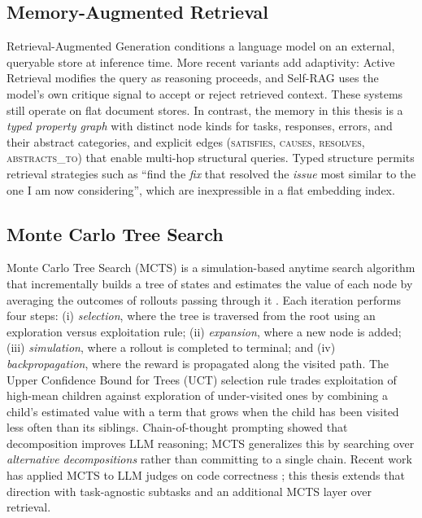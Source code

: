 \documentclass[12pt,a4paper]{report}
\begin{document}
\subsection{Memory-Augmented Retrieval}

Retrieval-Augmented Generation \cite{rag_original2020} conditions a language model on an external, queryable store at inference time. More recent variants add adaptivity: Active Retrieval \cite{active_rag2023} modifies the query as reasoning proceeds, and Self-RAG \cite{self_rag2023} uses the model's own critique signal to accept or reject retrieved context. These systems still operate on flat document stores. In contrast, the memory in this thesis is a \textit{typed property graph} with distinct node kinds for tasks, responses, errors, and their abstract categories, and explicit edges (\textsc{satisfies}, \textsc{causes}, \textsc{resolves}, \textsc{abstracts\_to}) that enable multi-hop structural queries. Typed structure permits retrieval strategies such as ``find the \textit{fix} that resolved the \textit{issue} most similar to the one I am now considering'', which are inexpressible in a flat embedding index.

\subsection{Monte Carlo Tree Search}

Monte Carlo Tree Search (MCTS) is a simulation-based anytime search algorithm that incrementally builds a tree of states and estimates the value of each node by averaging the outcomes of rollouts passing through it \cite{uct2006, alpha_go2016}. Each iteration performs four steps: (i) \textit{selection}, where the tree is traversed from the root using an exploration versus exploitation rule; (ii) \textit{expansion}, where a new node is added; (iii) \textit{simulation}, where a rollout is completed to terminal; and (iv) \textit{backpropagation}, where the reward is propagated along the visited path. The Upper Confidence Bound for Trees (UCT) selection rule trades exploitation of high-mean children against exploration of under-visited ones by combining a child's estimated value with a term that grows when the child has been visited less often than its siblings. Chain-of-thought prompting \cite{chain_of_thought2022} showed that decomposition improves LLM reasoning; MCTS generalizes this by searching over \textit{alternative decompositions} rather than committing to a single chain. Recent work has applied MCTS to LLM judges on code correctness \cite{mcts_judge2025}; this thesis extends that direction with task-agnostic subtasks and an additional MCTS layer over retrieval.
\end{document}
